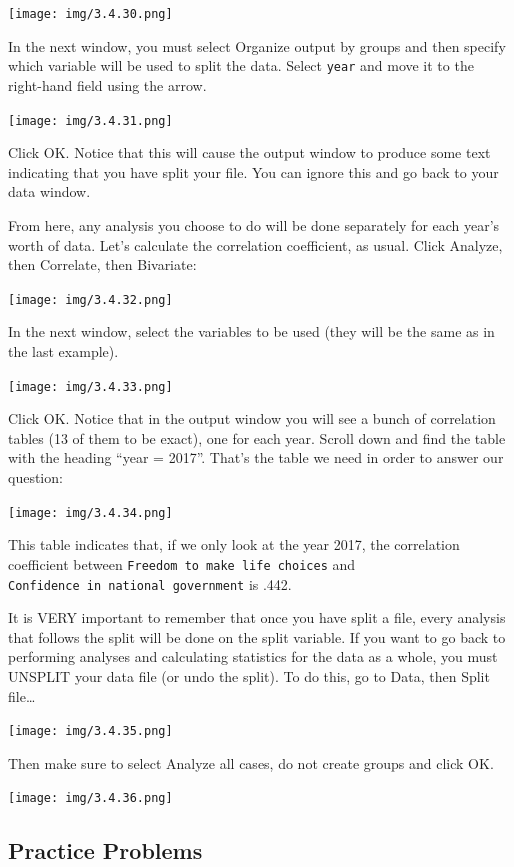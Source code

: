 \documentclass[]{book}
\begin{document}
\texttt{[image: img/3.4.30.png]}

In the next window, you must select {Organize output by groups} and then
specify which variable will be used to split the data. Select
\texttt{year} and move it to the right-hand field using the arrow.

\texttt{[image: img/3.4.31.png]}

Click {OK}. Notice that this will cause the output window to produce
some text indicating that you have split your file. You can ignore this
and go back to your data window.

From here, any analysis you choose to do will be done separately for
each year's worth of data. Let's calculate the correlation coefficient,
as usual. Click {Analyze}, then {Correlate}, then {Bivariate}:

\texttt{[image: img/3.4.32.png]}

In the next window, select the variables to be used (they will be the
same as in the last example).

\texttt{[image: img/3.4.33.png]}

Click {OK}. Notice that in the output window you will see a bunch of
correlation tables (13 of them to be exact), one for each year. Scroll
down and find the table with the heading ``year = 2017''. That's the
table we need in order to answer our question:

\texttt{[image: img/3.4.34.png]}

This table indicates that, if we only look at the year 2017, the
correlation coefficient between
\texttt{Freedom\ to\ make\ life\ choices} and
\texttt{Confidence\ in\ national\ government} is .442.

It is VERY important to remember that once you have split a file, every
analysis that follows the split will be done on the split variable. If
you want to go back to performing analyses and calculating statistics
for the data as a whole, you must UNSPLIT your data file (or undo the
split). To do this, go to {Data}, then {Split file\ldots{}}

\texttt{[image: img/3.4.35.png]}

Then make sure to select {Analyze all cases, do not create groups} and
click {OK}.

\texttt{[image: img/3.4.36.png]}

\subsection{Practice Problems}\label{practice-problems-3}
\end{document}
